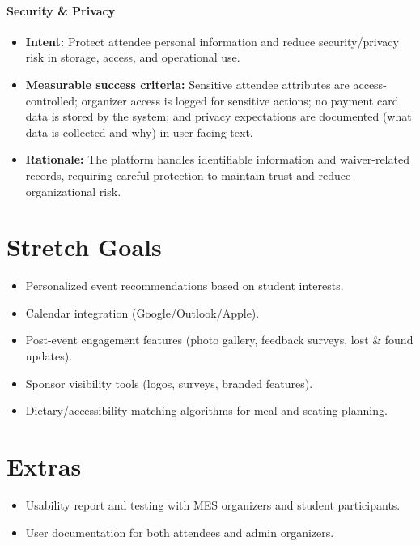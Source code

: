 \documentclass{article}
\begin{document}
\paragraph{Security \& Privacy}
\begin{itemize}
    \item \textbf{Intent:} Protect attendee personal information and reduce security/privacy risk in storage, access, and operational use.
    \item \textbf{Measurable success criteria:} Sensitive attendee attributes are access-controlled; organizer access is logged for sensitive actions; no payment card data is stored by the system; and privacy expectations are documented (what data is collected and why) in user-facing text.
    \item \textbf{Rationale:} The platform handles identifiable information and waiver-related records, requiring careful protection to maintain trust and reduce organizational risk.
\end{itemize}

\section{Stretch Goals}

\begin{itemize}
    \item Personalized event recommendations based on student interests.
    \item Calendar integration (Google/Outlook/Apple).
    \item Post-event engagement features (photo gallery, feedback surveys, lost \& found updates).
    \item Sponsor visibility tools (logos, surveys, branded features).
    \item Dietary/accessibility matching algorithms for meal and seating planning.
\end{itemize}

\section{Extras}

\begin{itemize}
    \item Usability report and testing with MES organizers and student participants.
    \item User documentation for both attendees and admin organizers.
\end{itemize}
\end{document}
